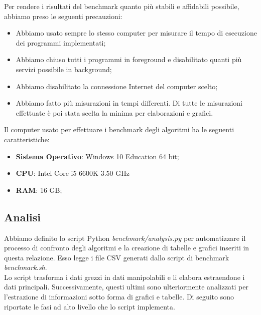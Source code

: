 \noindent Per rendere i risultati del benchmark quanto più stabili e
affidabili possibile, abbiamo preso le seguenti precauzioni:

\begin{itemize}
    \item Abbiamo usato sempre lo stesso computer per misurare il
      tempo di esecuzione dei programmi implementati;
    \item Abbiamo chiuso tutti i programmi in foreground e
      disabilitato quanti più servizi possibile in background;
    \item Abbiamo disabilitato la connessione Internet del computer
      scelto;
    \item Abbiamo fatto più misurazioni in tempi differenti. Di tutte
      le misurazioni effettuate è poi stata scelta la minima per
      elaborazioni e grafici.
\end{itemize}

\noindent Il computer usato per effettuare i benchmark degli algoritmi
ha le seguenti caratteristiche:

\begin{itemize}
    \item \textbf{Sistema Operativo}: Windows 10 Education 64 bit;
    \item \textbf{CPU}: Intel Core i5 6600K 3.50 GHz
    \item \textbf{RAM}: 16 GB;
\end{itemize}

\subsection{Analisi}

\noindent Abbiamo definito lo script Python
\textit{benchmark/analysis.py} per automatizzare il processo di
confronto degli algoritmi e la creazione di tabelle e grafici inseriti
in questa relazione. Esso legge i file CSV generati dallo script di
benchmark \textit{benchmark.sh}. \\

\noindent Lo script trasforma i dati grezzi in dati manipolabili e li
elabora estraendone i dati principali. Successivamente, questi ultimi
sono ulteriormente analizzati per l'estrazione di informazioni sotto
forma di grafici e tabelle. Di seguito sono riportate le fasi ad alto
livello che lo script implementa.

